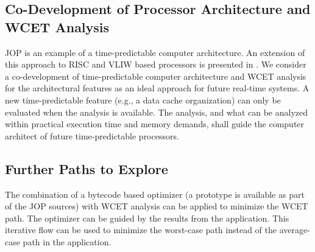 %
%

\subsection{Co-Development of Processor Architecture and WCET
Analysis}

JOP is an example of a time-predictable computer architecture. An
extension of this approach to RISC and VLIW based processors is
presented in \cite{tpca:jes}. We consider a co-development of
time-predictable computer architecture and WCET analysis for the
architectural features as an ideal approach for future real-time
systems. A new time-predictable feature (e.g., a data cache
organization) can only be evaluated when the analysis is available.
The analysis, and what can be analyzed within practical execution
time and memory demands, shall guide the computer architect of future
time-predictable processors.

\subsection{Further Paths to Explore}

The combination of a bytecode based optimizer (a prototype is
available as part of the JOP sources) with WCET analysis can be
applied to minimize the WCET path. The optimizer can be guided by the
results from the application. This iterative flow can be used to
minimize the worst-case path instead of the average-case path in the
application.

